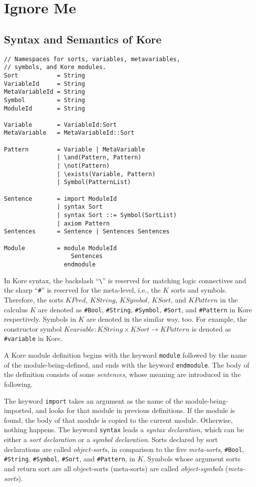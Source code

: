 \documentclass[UTF8,11pt]{article}
\theoremstyle{plain}
\theoremstyle{definition}
\theoremstyle{remark}
\newcommand{\KPred}{\mathit{KPred}}
\newcommand{\KString}{\mathit{KString}}
\newcommand{\KSort}{\mathit{KSort}}
\newcommand{\KSymbol}{\mathit{KSymbol}}
\newcommand{\KPattern}{\mathit{KPattern}}
\newcommand{\Kvariable}{\mathit{Kvariable}}
\begin{document}
\section{Ignore Me}

\subsection{Syntax and Semantics of Kore}
\label{sec:syntax-of-kore}

\begin{Verbatim}[fontsize=\small]
// Namespaces for sorts, variables, metavariables,
// symbols, and Kore modules.
Sort           = String
VariableId     = String
MetaVariableId = String
Symbol         = String
ModuleId       = String

Variable       = VariableId:Sort
MetaVariable   = MetaVariableId::Sort

Pattern        = Variable | MetaVariable
               | \and(Pattern, Pattern)
               | \not(Pattern)
               | \exists(Variable, Pattern)
               | Symbol(PatternList)

Sentence       = import ModuleId
               | syntax Sort
               | syntax Sort ::= Symbol(SortList)
               | axiom Pattern
Sentences      = Sentence | Sentences Sentences

Module         = module ModuleId
                   Sentences
                 endmodule
\end{Verbatim}

In Kore syntax, the backslash ``\verb|\|'' is reserved for matching logic connectives and the sharp ``\verb|#|'' is reserved for the meta-level, i.e., the $K$ sorts and symbols. 
Therefore, the sorts $\KPred$, $\KString$, $\KSymbol$, $\KSort$, and 
$\KPattern$ in the calculus $K$ are denoted as \verb|#Bool|, \verb|#String|, 
\verb|#Symbol|, \verb|#Sort|, and \verb|#Pattern| in Kore respectively.
Symbols in $K$ are denoted in the similar way, too. 
For example, the constructor symbol $\Kvariable \colon \KString \times \KSort \to \KPattern$ is denoted as \verb|#variable| in Kore. 

A Kore module definition begins with the keyword \verb|module| followed by the name of the module-being-defined, and ends with the keyword \verb|endmodule|. The body of the definition consists of some \emph{sentences}, whose meaning are introduced in the following.

The keyword \verb|import| takes an argument as the name of the module-being-imported, and looks for that module in previous definitions. 
If the module is found, the body of that module is copied to the current module.
Otherwise, nothing happens. 
The keyword \verb|syntax| leads a \emph{syntax declaration}, which can be either a \emph{sort declaration} or a \emph{symbol declaration}.
Sorts declared by sort declarations are called \emph{object-sorts}, in comparison to the five \emph{meta-sorts}, \verb|#Bool|, \verb|#String|, \verb|#Symbol|, \verb|#Sort|, and \verb|#Pattern|, in $K$. 
Symbols whose argument sorts and return sort are all object-sorts (meta-sorts) are called \emph{object-symbols} (\emph{meta-sorts}).
\end{document}
